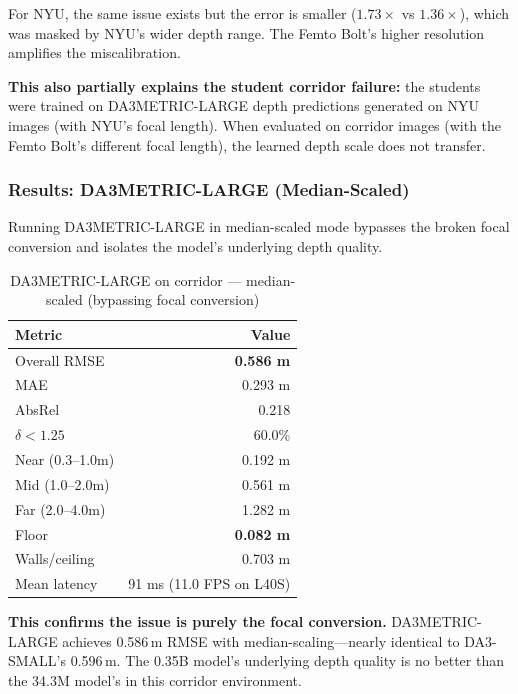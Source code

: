 \documentclass[11pt,a4paper]{article}
\begin{document}
For NYU, the same issue exists but the error is smaller
($1.73 \times$ vs $1.36 \times$), which was masked by NYU's wider depth
range. The Femto Bolt's higher resolution amplifies the miscalibration.

\textbf{This also partially explains the student corridor failure:} the
students were trained on DA3METRIC-LARGE depth predictions generated
on NYU images (with NYU's focal length). When evaluated on corridor
images (with the Femto Bolt's different focal length), the learned
depth scale does not transfer.

\subsubsection{Results: DA3METRIC-LARGE (Median-Scaled)}

Running DA3METRIC-LARGE in median-scaled mode bypasses the broken
focal conversion and isolates the model's underlying depth quality.

\begin{table}[h]
\centering
\caption{DA3METRIC-LARGE on corridor --- median-scaled (bypassing focal conversion)}
\label{tab:iter9-metric-large-median}
\begin{tabular}{lr}
\toprule
\textbf{Metric} & \textbf{Value} \\
\midrule
Overall RMSE      & \textcolor{improved}{\textbf{0.586 m}} \\
MAE               & 0.293 m \\
AbsRel            & 0.218 \\
$\delta < 1.25$   & 60.0\% \\
\midrule
Near (0.3--1.0m)  & 0.192 m \\
Mid (1.0--2.0m)   & 0.561 m \\
Far (2.0--4.0m)   & 1.282 m \\
\midrule
Floor             & \textcolor{improved}{\textbf{0.082 m}} \\
Walls/ceiling     & 0.703 m \\
\midrule
Mean latency      & 91 ms (11.0 FPS on L40S) \\
\bottomrule
\end{tabular}
\end{table}

\textbf{This confirms the issue is purely the focal conversion.}
DA3METRIC-LARGE achieves 0.586\,m RMSE with median-scaling---nearly
identical to DA3-SMALL's 0.596\,m. The 0.35B model's underlying depth
quality is no better than the 34.3M model's in this corridor environment.
\end{document}
